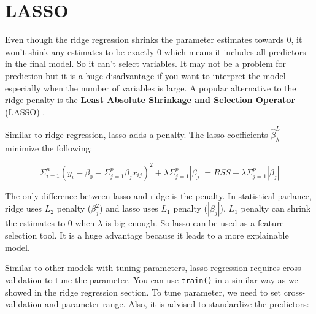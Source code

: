 \documentclass[
  12pt,
]{krantz}
\begin{document}
\hypertarget{lasso}{%
\section{LASSO}\label{lasso}}

Even though the ridge regression shrinks the parameter estimates towards 0, it won't shink any estimates to be exactly 0 which means it includes all predictors in the final model. So it can't select variables. It may not be a problem for prediction but it is a huge disadvantage if you want to interpret the model especially when the number of variables is large. A popular alternative to the ridge penalty is the \textbf{Least Absolute Shrinkage and Selection Operator} (LASSO) \citep{Tibshirani1996}.

Similar to ridge regression, lasso adds a penalty. The lasso coefficients \(\hat{\beta}_{\lambda}^{L}\) minimize the following:

\begin{equation}
\Sigma_{i=1}^{n}(y_{i}-\beta_{0}-\Sigma_{j=1}^{p}\beta_{j}x_{ij})^{2}+\lambda\Sigma_{j=1}^{p}|\beta_{j}|=RSS+\lambda\Sigma_{j=1}^{p}|\beta_{j}|
\label{eq:lasso}
\end{equation}

The only difference between lasso and ridge is the penalty. In statistical parlance, ridge uses \(L_2\) penalty (\(\beta_{j}^{2}\)) and lasso uses \(L_1\) penalty (\(|\beta_{j}|\)). \(L_1\) penalty can shrink the estimates to 0 when \(\lambda\) is big enough. So lasso can be used as a feature selection tool. It is a huge advantage because it leads to a more explainable model.

Similar to other models with tuning parameters, lasso regression requires cross-validation to tune the parameter. You can use \texttt{train()} in a similar way as we showed in the ridge regression section. To tune parameter, we need to set cross-validation and parameter range. Also, it is advised to standardize the predictors:
\end{document}
